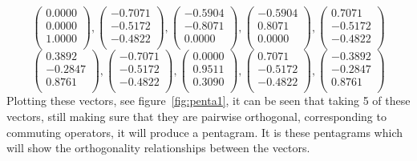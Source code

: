 \begin{equation*}
\begin{pmatrix}
0.0000\\
0.0000\\
1.0000\\
\end{pmatrix}
,
\begin{pmatrix}
-0.7071\\
-0.5172\\
-0.4822\\
\end{pmatrix}
,
\begin{pmatrix}
-0.5904\\
-0.8071\\
0.0000\\
\end{pmatrix}
,
\begin{pmatrix}
-0.5904\\
0.8071\\
0.0000\\
\end{pmatrix}
,
\begin{pmatrix}
0.7071\\
-0.5172\\
-0.4822\\
\end{pmatrix}
\end{equation*}
\begin{equation*}
\begin{pmatrix}
0.3892\\
-0.2847\\
0.8761\\
\end{pmatrix}
,
\begin{pmatrix}
-0.7071\\
-0.5172\\
-0.4822\\
\end{pmatrix}
,
\begin{pmatrix}
0.0000\\
0.9511\\
0.3090\\
\end{pmatrix}
,
\begin{pmatrix}
0.7071\\
-0.5172\\
-0.4822\\
\end{pmatrix}
,
\begin{pmatrix}
-0.3892\\
-0.2847\\
0.8761\\
\end{pmatrix}
\end{equation*}
Plotting these vectors, see figure~\ref{fig:penta1}, it can be seen that taking 5 of these vectors, still making sure that they are pairwise orthogonal, corresponding to commuting operators, it will produce a pentagram.
It is these pentagrams which will show the orthogonality relationships between the vectors. 
